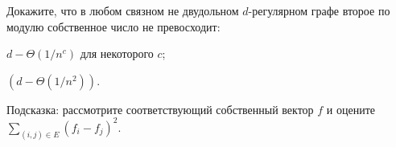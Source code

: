 Докажите, что в любом связном не двудольном $d$-регулярном графе второе по модулю собственное число не превосходит:
\begin{enumcyr}
    \item $d - \Theta(1 / n^c)$ для некоторого $c$;
    \item $(d - \Theta(1 / n^2))$.
\end{enumcyr}

Подсказка: рассмотрите соответствующий собственный вектор $f$ и оцените $\sum\limits_{(i, j) \in E} (f_i - f_j)^2$.